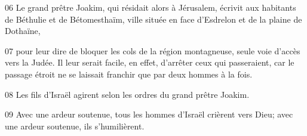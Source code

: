 

06 Le grand prêtre Joakim, qui résidait alors à Jérusalem, écrivit aux habitants de Béthulie et de Bétomesthaïm, ville située en face d'Esdrelon et de la plaine de Dothaïne,

07 pour leur dire de bloquer les cols de la région montagneuse, seule voie d'accès vers la Judée. Il leur serait facile, en effet, d'arrêter ceux qui passeraient, car le passage étroit ne se laissait franchir que par deux hommes à la fois.

08 Les fils d'Israël agirent selon les ordres du grand prêtre Joakim.

09 Avec une ardeur soutenue, tous les hommes d'Israël crièrent vers Dieu; avec une ardeur soutenue, ils s'humilièrent.
